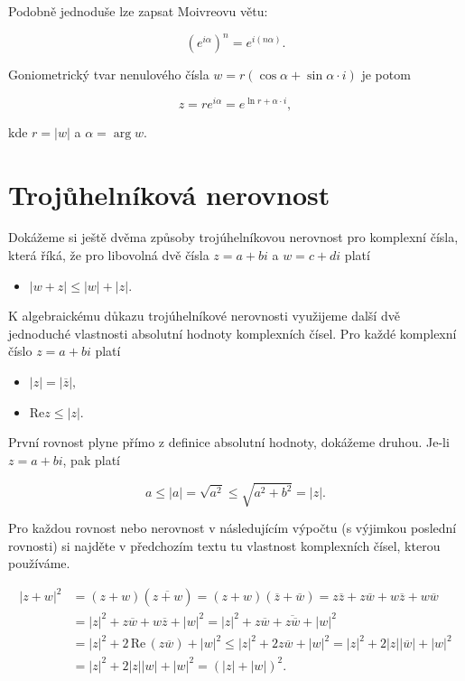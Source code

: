 \documentclass[12pt,a4paper]{report}
\begin{document}
	Podobně jednoduše lze zapsat Moivreovu větu:
	
	\begin{equation}
		(e^{i\alpha})^n = e^{i(n\alpha)}.
	\end{equation}
	
	Goniometrický tvar nenulového čísla $w = r(\cos\alpha + \sin\alpha\cdot i)$ je potom
	
	\begin{equation}
		z = re^{i\alpha} = e^{\ln r + \alpha\cdot i},
	\end{equation}
	
	kde $r = |w|$ a $\alpha = \arg w.$
	
	
	\section{Trojůhelníková nerovnost}
	
	Dokážeme si ještě dvěma způsoby trojúhelníkovou nerovnost pro komplexní čísla, která říká, že pro libovolná dvě čísla $z = a+bi$ a $w = c+di$ platí
	
	\begin{itemize}
		\item $|w+z| \le |w| + |z|.$
	\end{itemize}
	
	K algebraickému důkazu trojúhelníkové nerovnosti využijeme další dvě jednoduché vlastnosti absolutní hodnoty komplexních čísel. Pro každé komplexní číslo $z = a+bi$ platí
	
	\begin{itemize}
		\item $|z| = |\overline{z}|,$
		\item $\text{Re}z \le |z|.$
	\end{itemize}
	
	První rovnost plyne přímo z definice absolutní hodnoty, dokážeme druhou. Je-li $z =a+bi$, pak platí
	
	\begin{equation}
		a\le |a| = \sqrt{a^2} \le \sqrt{a^2 + b^2} = |z|.
	\end{equation}
	
	\newpage
	
	Pro každou rovnost nebo nerovnost v následujícím výpočtu (s výjimkou poslední rovnosti) si najděte v předchozím textu tu vlastnost komplexních čísel, kterou používáme.
	
	
	\begin{align}
		|z + w|^2 &= (z + w)(\overline{z + w}) = (z + w)(\overline{z} + \overline{w}) = z\overline{z} + z\overline{w} + w\overline{z} + w\overline{w}\\
		&= |z|^2 + z\overline{w} + w\overline{z} + |w|^2 = |z|^2 + z\overline{w} + \overline{z\overline{w}} + |w|^2\\
		&= |z|^2 + 2\,\text{Re}\,(z\overline{w}) + |w|^2 \le |z|^2 + 2z\overline{w} + |w|^2 = |z|^2 + 2|z||\overline{w}| + |w|^2\\
		&= |z|^2 + 2|z||w| + |w|^2 = (|z| + |w|)^2.
	\end{align}
	
\end{document}
